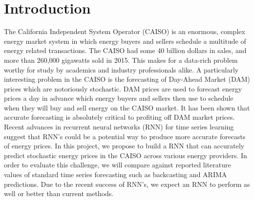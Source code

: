 \documentclass[sigconf]{acmart}
\begin{document}
\section{Introduction}


The California Independent System Operator (CAISO) is an enormous, complex energy market system in which energy buyers and sellers schedule a multitude of energy related transactions. The CAISO had some 40 billion dollars in sales, and more than 260,000 gigawatts sold in 2015\cite{CAenergy2}. This makes for a data-rich problem worthy for study by academics and industry professionals alike. A particularly interesting problem in the CAISO is the forecasting of Day-Ahead Market (DAM) prices which are notoriously stochastic. DAM prices are used to forecast energy prices a day in advance which energy buyers and sellers then use to schedule when they will buy and sell energy on the CAISO market. It has been shown that accurate forecasting is absolutely critical to profiting off DAM market prices\cite{Dowling2017}.\\
Recent advances in recurrent neural networks (RNN) for time series learning suggest that RNN's could be a potential way to produce more accurate forecasts of energy prices. In this project, we propose to build a RNN that can accurately predict stochastic energy prices in the CAISO across various energy providers. In order to evaluate this challenge, we will compare against reported literature values of standard time series forecasting such as backcasting and ARIMA predictions\cite{Conejo2005a}. Due to the recent success of RNN's, we expect an RNN to perform as well or better than current methods. 
\end{document}
